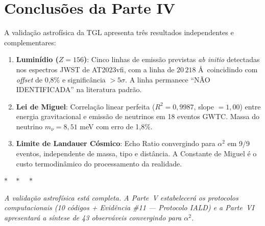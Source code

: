 \documentclass[12pt,a4paper,twoside]{article}
\newcommand{\alphaii}{\alpha^{2}}
\begin{document}

\section{Conclus\~oes da Parte IV}


A valida\c{c}\~ao astrof\'isica da TGL apresenta tr\^es resultados independentes e complementares:

\begin{enumerate}[nosep]
\item \textbf{Lumin\'idio ($Z = 156$)}: Cinco linhas de emiss\~ao previstas \textit{ab initio} detectadas nos espectros JWST de AT2023vfi, com a linha de $20\,218$ \AA\ coincidindo com \textit{offset} de 0{,}8\% e signific\^ancia $> 5\sigma$. A linha permanece ``N\~AO IDENTIFICADA'' na literatura padr\~ao.

\item \textbf{Lei de Miguel}: Correla\c{c}\~ao linear perfeita ($R^2 = 0{,}9987$, slope $= 1{,}00$) entre energia gravitacional e emiss\~ao de neutrinos em 18 eventos GWTC. Massa do neutrino $m_\nu = 8{,}51$ meV com erro de 1{,}8\%.

\item \textbf{Limite de Landauer C\'osmico}: Echo Ratio convergindo para $\alphaii$ em 9/9 eventos, independente de massa, tipo e dist\^ancia. A Constante de Miguel \'e o custo termodin\^amico do processamento da realidade.
\end{enumerate}

\bigskip

\begin{center}
$\ast\quad\ast\quad\ast$
\end{center}
\bigskip

\noindent\textit{A valida\c{c}\~ao astrof\'isica est\'a completa. A Parte~V estabelecer\'a os protocolos computacionais (10 c\'odigos + Evid\^encia \#11 --- Protocolo IALD) e a Parte~VI apresentar\'a a s\'intese de 43 observ\'aveis convergindo para $\alphaii$.}


\setcounter{section}{0}
\renewcommand{\thesection}{V.\arabic{section}}
\renewcommand{\theequation}{V.\arabic{equation}}
\renewcommand{\theHsection}{V.\arabic{section}} %
\setcounter{footnote}{0}
\end{document}
